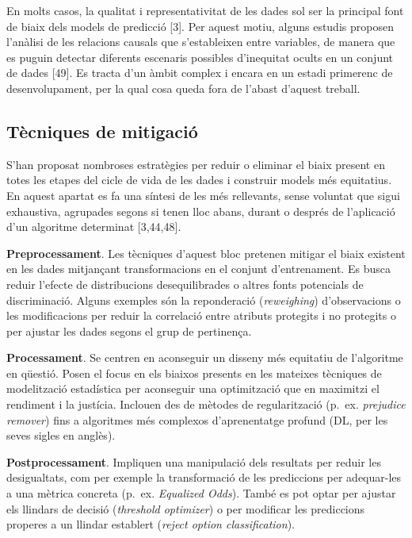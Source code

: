 \documentclass[CAT]{TFUOC}%
\begin{document}
En molts casos, la qualitat i representativitat de les dades sol ser la principal font de biaix dels models de predicció {[}3{]}. Per aquest motiu, alguns estudis proposen l'anàlisi de les relacions causals que s'estableixen entre variables, de manera que es puguin detectar diferents escenaris possibles d'inequitat ocults en un conjunt de dades {[}49{]}. Es tracta d'un àmbit complex i encara en un estadi primerenc de desenvolupament, per la qual cosa queda fora de l'abast d'aquest treball.

\subsection{Tècniques de mitigació}\label{tuxe8cniques-de-mitigaciuxf3}

S'han proposat nombroses estratègies per reduir o eliminar el biaix present en totes les etapes del cicle de vida de les dades i construir models més equitatius. En aquest apartat es fa una síntesi de les més rellevants, sense voluntat que sigui exhaustiva, agrupades segons si tenen lloc abans, durant o després de l'aplicació d'un algoritme determinat {[}3,44,48{]}.

\bigskip

\textbf{Preprocessament}. Les tècniques d'aquest bloc pretenen mitigar el biaix existent en les dades mitjançant transformacions en el conjunt d'entrenament. Es busca reduir l'efecte de distribucions desequilibrades o altres fonts potencials de discriminació. Alguns exemples són la reponderació (\emph{reweighing}) d'observacions o les modificacions per reduir la correlació entre atributs protegits i no protegits o per ajustar les dades segons el grup de pertinença.

\textbf{Processament}. Se centren en aconseguir un disseny més equitatiu de l'algoritme en qüestió. Posen el focus en els biaixos presents en les mateixes tècniques de modelització estadística per aconseguir una optimització que en maximitzi el rendiment i la justícia. Inclouen des de mètodes de regularització (p.~ex. \emph{prejudice remover}) fins a algoritmes més complexos d'aprenentatge profund (DL, per les seves sigles en anglès).

\textbf{Postprocessament}. Impliquen una manipulació dels resultats per reduir les desigualtats, com per exemple la transformació de les prediccions per adequar-les a una mètrica concreta (p.~ex. \emph{Equalized Odds}). També es pot optar per ajustar els llindars de decisió (\emph{threshold optimizer}) o per modificar les prediccions properes a un llindar establert (\emph{reject option classification}).
\end{document}
